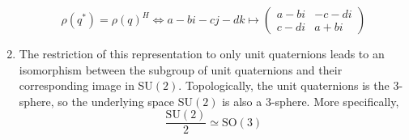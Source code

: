 \begin{theorem}
\begin{enumerate}
          \begin{equation}
            \rho(q^*) = \rho(q)^H \iff a-bi-cj-dk \mapsto \begin{pmatrix}
            a-bi & -c-di \\ c-di & a+bi
            \end{pmatrix}
          \end{equation}
        \item The restriction of this representation to only unit quaternions leads to an isomorphism between the subgroup of unit quaternions and their corresponding image in SU$(2)$. Topologically, the unit quaternions is the $3$-sphere, so the underlying space SU$(2)$ is also a $3$-sphere. More specifically, 
          \begin{equation}
            \frac{\text{SU}(2)}{2} \simeq \text{SO}(3)
          \end{equation}
      \end{enumerate}
    \end{theorem}

